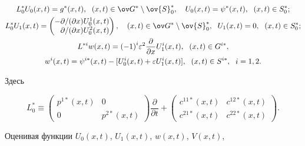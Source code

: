 \begin{gather*}


L^*_0 U_0(x,t)=g^*(x,t), \ \; (x, t)\in \ov G^*\setminus


\ov{S}^*_0,\quad U_0(x, t)=\psi^*(x, t), \ \; (x, t)\in S^*_0;\\


L^*_0 U_1(x, t)=


\begin{pmatrix}


-\partial/(\partial x) U^1_0(x,t)\\


\phantom{-}\partial/(\partial x) U^2_0(x,t)


\end{pmatrix}


, \quad (x, t)\in \ov G^*\setminus


\ov{S}^*_0,\ \; U_1(x, t)=0, \ \; (x, t)\in S^*_0;\\


L^{*i} w(x, t)={(-1)}^i \varepsilon^2 \frac{\partial}{\partial x}


U^i_1(x, t), \ \; (x, t)\in G^{i*},\\


w^i(x, t)=\psi^{i*}(x, t)-[U^i_0(x, t)+\varepsilon U^i_1(x, t)],


\ \; (x, t)\in S^{i*}, \ \; i=1, 2.


\end{gather*}


Здесь


$$


L^*_0\equiv


\begin{pmatrix}


p^{1*}(x, t) & 0\\ 0 & p^{2*}(x, t)


\end{pmatrix}


\frac{\partial}{\partial t}+


\begin{pmatrix}


c^{11*}(x,t) & c^{12*}(x,t)\\ c^{21*}(x,t) & c^{22*}(x, t)


\end{pmatrix}.


$$





Оценивая функции $U_0(x, t)$, $U_1(x, t)$, $w(x, t)$, $V(x, t)$,


